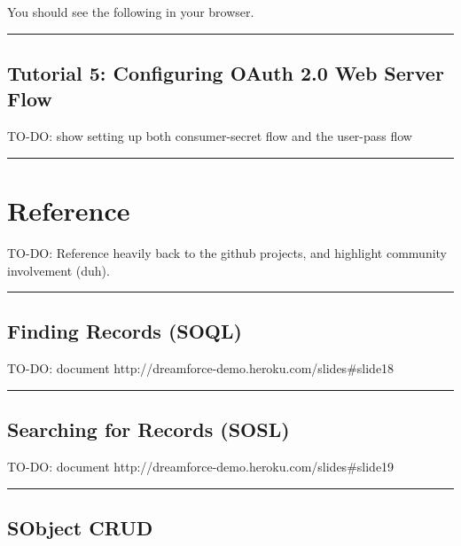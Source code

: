 \documentclass{article}
\begin{document}
You should see the following in your browser. 


\vspace{.5em} \hrule \vspace{.5em}
\hypertarget{tutorial_5_configuring_oauth_20_web_server_flow}{}\subsection*{{Tutorial 5: Configuring OAuth 2.0 Web Server Flow}}\label{tutorial_5_configuring_oauth_20_web_server_flow}

TO-DO: show setting up both consumer-secret flow and the user-pass flow


\vspace{.5em} \hrule \vspace{.5em}
\hypertarget{reference}{}\section*{{Reference}}\label{reference}

TO-DO: Reference heavily back to the github projects, and highlight community involvement (duh).


\vspace{.5em} \hrule \vspace{.5em}
\hypertarget{finding_records_soql}{}\subsection*{{Finding Records (SOQL)}}\label{finding_records_soql}

TO-DO: document http://dreamforce-demo.heroku.com/slides#slide18


\vspace{.5em} \hrule \vspace{.5em}
\hypertarget{searching_for_records_sosl}{}\subsection*{{Searching for Records (SOSL)}}\label{searching_for_records_sosl}

TO-DO: document http://dreamforce-demo.heroku.com/slides#slide19


\vspace{.5em} \hrule \vspace{.5em}
\hypertarget{sobject_crud}{}\subsection*{{SObject CRUD}}\label{sobject_crud}
\end{document}
